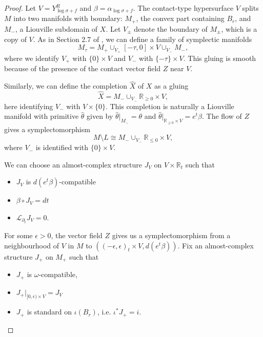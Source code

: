 \documentclass{article}
\numberwithin{equation}{section}
\numberwithin{figure}{section}
\begin{document}
\begin{proof}
Let $V=Y^R_{\log\sigma+f}$ and $\beta=\alpha_{\log\sigma+f}$.
The contact-type hypersurface $V$ splits $M$ into two manifolds with boundary: $M_+$, the convex part containing $B_r$, and $M_-$, a Liouville subdomain of $X$. Let $V_\pm$ denote the boundary of $M_\pm$, which is a copy of $V$. As in Section 2.7 of \cite{CM}, we can define a family of symplectic manifolds
\begin{equation}
M_\tau=M_+\cup_{V_+}[-\tau,0]\times V \cup_{V_-}M_-,
\end{equation}
where we identify $V_+$ with $\{0\}\times V$ and $V_-$ with $\{-\tau\}\times V$. This gluing is smooth because of the presence of the contact vector field $Z$ near $V$.

Similarly, we can define the completion $\hat{X}$ of $X$ as a gluing
\begin{equation}
\hat{X}=M_-\cup_{V_-}\mathbb{R}_{\geq 0}\times V,
\end{equation}
here identifying $V_-$ with $V\times \{0\}$. This completion is naturally a Liouville manifold with primitive $\hat{\theta}$ given by $\hat{\theta}|_{M_-}=\theta$ and $\hat{\theta}|_{\mathbb{R}_{\geq 0}\times V}=e^t\beta$. The flow of $Z$ gives a symplectomorphism
\begin{equation}
    M\setminus L\cong M_-\cup_{V_-}\mathbb{R}_{\leq 0}\times V,
\end{equation}
where $V_-$ is identified with $\{0\}\times V$.

We can choose an almost-complex structure $J_V$ on $V\times\mathbb{R}_t$ such that
\begin{itemize}
    \item $J_V$ is $d(e^t\beta)$-compatible
    \item $\beta\circ J_V=dt$
    \item $\mathcal{L}_{\partial_t}J_V=0$.
\end{itemize}
For some $\epsilon>0$, the vector field $Z$ gives us a symplectomorphism from a neighbourhood of $V$ in $M$ to $((-\epsilon,\epsilon)_t\times V,d(e^t\beta))$. Fix an almost-complex structure $J_+$ on $M_+$ such that
\begin{itemize}
    \item $J_+$ is $\omega$-compatible,
    \item $J_+|_{[0,\epsilon)\times V}=J_V$
    \item $J_+$ is standard on $\iota(B_r)$, i.e. $\iota^*J_+=i$.
\end{itemize}


\end{proof}
\end{document}
